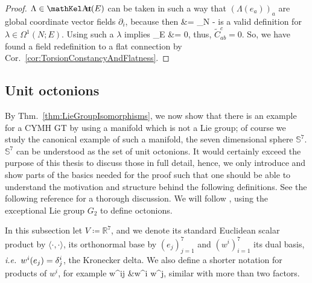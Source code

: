 \begin{proof}

$\Lambda \in \sAut(E)$ can be taken in such a way that $\left(\Lambda(e_a)\right)_a$ are global coordinate vector fields $\partial_i$, because then
\bas
\lambda
&=
_{N} 
	- \Lambda
\eas
is a valid definition for $\lambda \in \Omega^1(N;E)$. Using such a $\lambda$ implies
\bas
{}_E
&= 
0,
\eas
thus, $\widetilde{C}_{ab}^c = 0$. So, we have found a field redefinition to a flat connection by Cor.~\ref{cor:TorsionConstancyAndFlatness}.
\end{proof}

\subsection{Unit octonions}\label{UnitoctonionsasGT}

By Thm.~\ref{thm:LieGroupIsomorphisms}, we now show that there is an example for a CYMH GT by using a manifold which is not a Lie group; of course we study the canonical example of such a manifold, the seven dimensional sphere $\mathds{S}^7$. $\mathds{S}^7$ can be understood as the set of unit octonions. It would certainly exceed the purpose of this thesis to discuss those in full detail, hence, we only introduce and show parts of the basics needed for the proof such that one should be able to understand the motivation and structure behind the following definitions. See the following reference for a thorough discussion. We will follow \cite[\S 3.10, page 170ff.; Exercise 3.12.15, page 189f.; Example 4.5.10, page 229]{hamilton}, using the exceptional Lie group $G_2$ to define octonions.

In this subsection let $V \coloneqq \mathbb{R}^7$, and we denote its standard Euclidean scalar product by $\langle \cdot, \cdot \rangle$, its orthonormal base by $\left(e_j\right)_{j=1}^7$ and $\left(w^i\right)_{i=1}^7$ its dual basis, \textit{i.e.}~$w^i\mleft(e_j\mright) = \delta_j^i$, the Kronecker delta. We also define a shorter notation for products of $w^i$, for example
\bas
w^{ij} &\coloneqq w^i \wedge w^j,
\eas
similar with more than two factors.

